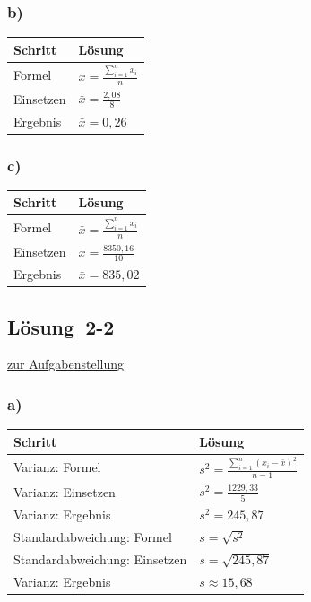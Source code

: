 \documentclass[
  11pt,
  ngerman,
  a4paper,
]{report}
\begin{document}
\hypertarget{b-2}{%
\subsubsection{b)}\label{b-2}}

\begin{table}[H]
\centering
\begin{tabular}{ll}
\toprule
\textbf{Schritt} & \textbf{Lösung}\\
\midrule
Formel & $\bar{x}=\frac{\sum\limits_{i=1}^{n}x_{i}}{n}$\\
Einsetzen & $\bar{x}=\frac{2{,}08}{8}$\\
Ergebnis & $\bar{x}=0{,}26$\\
\bottomrule
\end{tabular}
\end{table}

\hypertarget{c-2}{%
\subsubsection{c)}\label{c-2}}

\begin{table}[H]
\centering
\begin{tabular}{ll}
\toprule
\textbf{Schritt} & \textbf{Lösung}\\
\midrule
Formel & $\bar{x}=\frac{\sum\limits_{i=1}^{n}x_{i}}{n}$\\
Einsetzen & $\bar{x}=\frac{8350{,}16}{10}$\\
Ergebnis & $\bar{x}=835{,}02$\\
\bottomrule
\end{tabular}
\end{table}

\hypertarget{loesung-2-2}{%
\subsection{Lösung~2-2}\label{loesung-2-2}}

\protect\hyperlink{aufgabe-2-2}{zur Aufgabenstellung}

\hypertarget{a-3}{%
\subsubsection{a)}\label{a-3}}

\begin{table}[H]
\centering
\begin{tabular}{ll}
\toprule
\textbf{Schritt} & \textbf{Lösung}\\
\midrule
Varianz: Formel & $s^2=\frac{\sum\limits_{i=1}^{n}(x_{i}-\bar{x})^2}{n-1}$\\
Varianz: Einsetzen & $s^2=\frac{1229{,}33}{5}$\\
Varianz: Ergebnis & $s^2=245{,}87$\\
Standardabweichung: Formel & $s=\sqrt{s^2}$\\
Standardabweichung: Einsetzen & $s=\sqrt{245{,}87}$\\
Varianz: Ergebnis & $s\approx15{,}68$\\
\bottomrule
\end{tabular}
\end{table}
\end{document}

